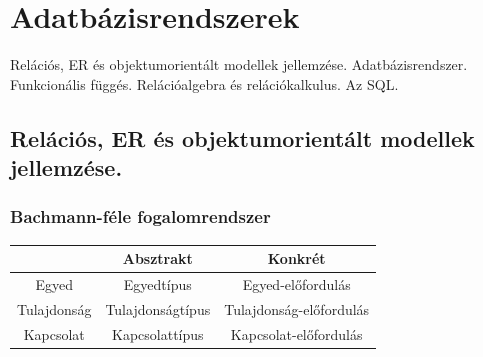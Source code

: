\section{Adatbázisrendszerek}
{\footnotesize Relációs, ER és objektumorientált modellek jellemzése. Adatbázisrendszer. Funkcionális függés. Relációalgebra és relációkalkulus. Az SQL.}
\subsection{Relációs, ER és objektumorientált modellek jellemzése.}
\subsubsection{Bachmann-féle fogalomrendszer}
\begin{tabular}{|c|c|c|}
	\hline 
	& Absztrakt & Konkrét \\ 
	\hline 
	Egyed & Egyedtípus & Egyed-előfordulás \\ 
	\hline 
	Tulajdonság & Tulajdonságtípus & Tulajdonság-előfordulás \\ 
	\hline 
	Kapcsolat & Kapcsolattípus & Kapcsolat-előfordulás \\ 
	\hline 
\end{tabular}

